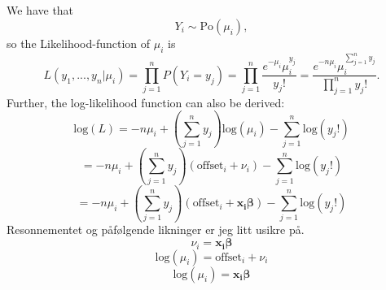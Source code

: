 \documentclass{article}
\begin{document}
\subsection{}
We have that
\begin{equation*}
Y_{i} \sim \text{Po}(\mu_{i}),
\end{equation*}
so the Likelihood-function of $\mu_{i}$ is
\begin{equation*}
	L(y_{1},...,y_{n}|\mu_{i}) = \prod_{j=1}^{n} P(Y_{i} = y_{j}) = \prod_{j=1}^{n} \frac{e^{-\mu_{i}}\mu_{i}^{y_{j}}}{y_{j}!} = \frac{e^{-n\mu_{i}} \mu_{i}^{\sum_{j=1}^{n} y_{j}} }{\prod_{j=1}^{n} y_{j}!}.
\end{equation*}
Further, the log-likelihood function can also be derived:
\begin{equation*}
\text{log}(L) = -n\mu_{i} + \left(\sum_{j=1}^{n} y_{j}\right)\text{log} (\mu_{i}) - \sum_{j = 1}^{n} \text{log}(y_{j}!)
\end{equation*}
\begin{equation*}
= -n\mu_{i} + \left(\sum_{j=1}^{n} y_{j}\right)(\text{offset}_{i} + \nu_{i}) - \sum_{j = 1}^{n} \text{log}(y_{j}!)
\end{equation*}
\begin{equation*}
= -n\mu_{i} + \left(\sum_{j=1}^{n} y_{j}\right)(\text{offset}_{i} + \boldsymbol{x_{i} \beta}) - \sum_{j = 1}^{n} \text{log}(y_{j}!)
\end{equation*}
Resonnementet og påfølgende likninger er jeg litt usikre på.
\begin{equation*}
\nu_{i} = \boldsymbol{x_{i} \beta}
\end{equation*}
\begin{equation*}
\text{log}(\mu_{i}) = \text{offset}_{i} + \nu_{i}
\end{equation*}
\begin{equation*}
\text{log}(\mu_{i}) = \boldsymbol{x_{i} \beta}
\end{equation*}

\section{}
\subsection{}
\end{document}
